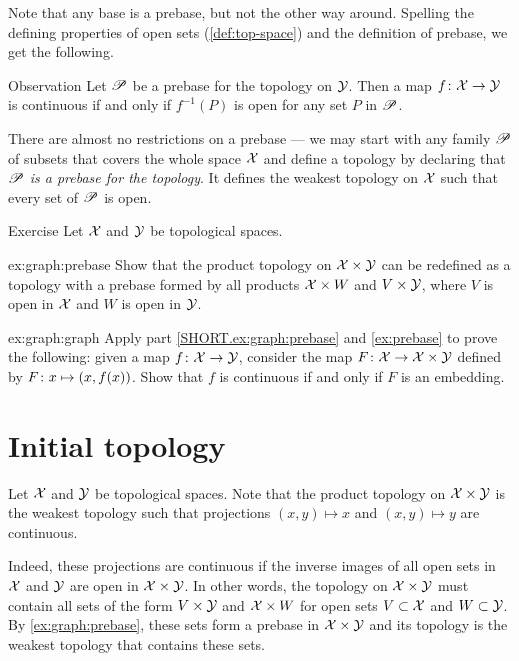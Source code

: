 Note that any base is a prebase, but not the other way around.
Spelling the defining properties of open sets (\ref{def:top-space}) and the definition of prebase, we get the following.

\begin{thm}{Observation}\label{ex:prebase}
Let $\mathscr{P}$ be a prebase for the topology on $\mathcal{Y}$.
Then a map $f\colon \mathcal{X} \to \mathcal{Y}$ is continuous if and only if $f^{-1}(P)$ is open for any set $P$ in $\mathscr{P}$.

\end{thm}

There are almost no restrictions on a prebase --- we may start with any family $\mathscr{P}$ of subsets that covers the whole space $\mathcal{X}$ and define a topology by declaring that \textit{$\mathscr{P}$ is a prebase for the topology}.
It defines the weakest topology on $\mathcal{X}$ such that every set of $\mathscr{P}$ is open.

\begin{thm}[!]{Exercise}\label{ex:graph}
Let $\mathcal{X}$ and $\mathcal{Y}$ be topological spaces.

\begin{subthm}{ex:graph:prebase}
Show that the product topology on $\mathcal{X}\times\mathcal{Y}$ can be redefined as a topology with a prebase formed by all products $\mathcal{X}\times W$ and $V\times \mathcal{Y}$, where $V$ is open in $\mathcal{X}$ and $W$ is open in $\mathcal{Y}$.
\end{subthm}

\begin{subthm}{ex:graph:graph}
Apply part \ref{SHORT.ex:graph:prebase} and \ref{ex:prebase} to prove the following:
given a map $f\:\c{X}\z\to \c{Y}$, consider the map $F\:\c{X}\z\to \c{X}\times\c{Y}$ defined by $F\:x\z\mapsto (x,f(x))$.
Show that $f$ is continuous if and only if $F$ is an embedding.
\end{subthm}

\end{thm}

\section{Initial topology}\label{induced-family}

Let $\mathcal{X}$ and $\mathcal{Y}$ be topological spaces.
Note that the product topology on $\mathcal{X}\times\mathcal{Y}$ is the weakest topology such that projections $(x,y)\mapsto x$ and $(x,y)\mapsto y$ are continuous.

Indeed, these projections are continuous if the inverse images of all open sets in $\mathcal{X}$ and $\mathcal{Y}$ are open in $\mathcal{X}\times\mathcal{Y}$.
In other words, the topology on $\mathcal{X}\times\mathcal{Y}$ must contain all sets of the form $V\times \mathcal{Y}$ and $\mathcal{X}\times W$ for open sets $V\subset \mathcal{X}$ and $W\subset \mathcal{Y}$.
By \ref{ex:graph:prebase}, these sets form a prebase in $\mathcal{X}\times\mathcal{Y}$ and its topology is the weakest topology  that contains these sets.

